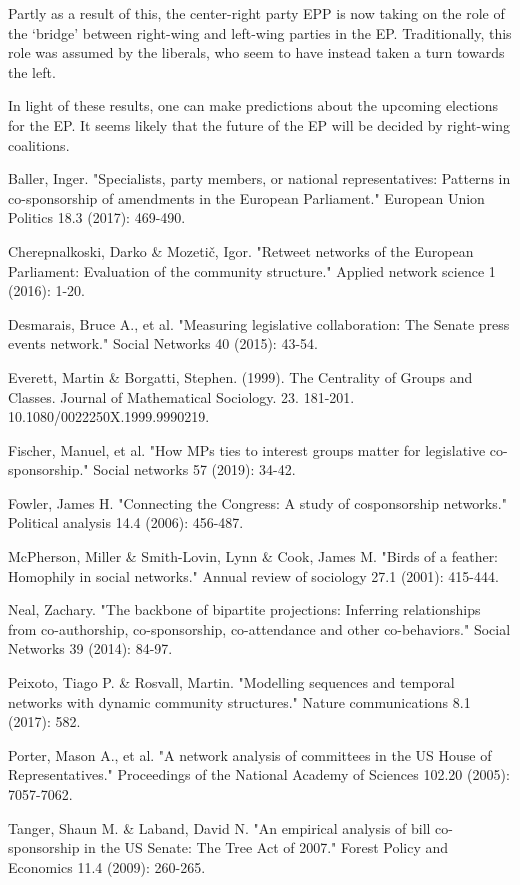 \documentclass[lettersize,journal]{IEEEtran}
\begin{document}
Partly as a result of this, the center-right party EPP is now taking on the role of the `bridge' between right-wing and left-wing parties in the EP. Traditionally, this role was assumed by the liberals, who seem to have instead taken a turn towards the left.

In light of these results, one can make predictions about the upcoming elections for the EP. It seems likely that the future of the EP will be decided by right-wing coalitions.


\begin{thebibliography}{1}


Baller, Inger. "Specialists, party members, or national representatives: Patterns in co-sponsorship of amendments in the European Parliament." European Union Politics 18.3 (2017): 469-490.

Cherepnalkoski, Darko \& Mozetič, Igor. "Retweet networks of the European Parliament: Evaluation of the community structure." Applied network science 1 (2016): 1-20.

Desmarais, Bruce A., et al. "Measuring legislative collaboration: The Senate press events network." Social Networks 40 (2015): 43-54.

Everett, Martin \& Borgatti, Stephen. (1999). The Centrality of Groups and Classes. Journal of Mathematical Sociology. 23. 181-201. 10.1080/0022250X.1999.9990219.

Fischer, Manuel, et al. "How MPs ties to interest groups matter for legislative co-sponsorship." Social networks 57 (2019): 34-42.

Fowler, James H. "Connecting the Congress: A study of cosponsorship networks." Political analysis 14.4 (2006): 456-487.

McPherson, Miller \& Smith-Lovin, Lynn \& Cook, James M. "Birds of a feather: Homophily in social networks." Annual review of sociology 27.1 (2001): 415-444.

Neal, Zachary. "The backbone of bipartite projections: Inferring relationships from co-authorship, co-sponsorship, co-attendance and other co-behaviors." Social Networks 39 (2014): 84-97.

Peixoto, Tiago P. \& Rosvall, Martin. "Modelling sequences and temporal networks with dynamic community structures." Nature communications 8.1 (2017): 582.

Porter, Mason A., et al. "A network analysis of committees in the US House of Representatives." Proceedings of the National Academy of Sciences 102.20 (2005): 7057-7062.

Tanger, Shaun M. \& Laband, David N. "An empirical analysis of bill co-sponsorship in the US Senate: The Tree Act of 2007." Forest Policy and Economics 11.4 (2009): 260-265.

\end{thebibliography}
\end{document}
